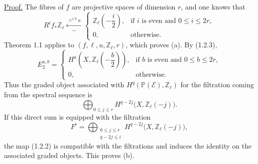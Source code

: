 \noindent\underline{Proof.}
The fibres of $f$ are projective spaces of dimension $r$, and one knows that
\begin{equation}\tag{1.2.3}
R^if_*\mathbb Z_\ell
\xleftarrow[\ \sim\ ]{\ \wedge^{i/2}u\ }
\begin{cases}
\mathbb Z_\ell\left(-\dfrac{i}{2}\right),
  & \text{if $i$ is even and $0\leq i\leq2r$},\\[2ex]
0, & \text{otherwise}.
\end{cases}
\end{equation}
Theorem 1.1 applies to $(f,\ell,u,\mathbb Z_\ell,r)$, which proves (a).
By (1.2.3),
\begin{equation}\tag{1.2.4}
E_2^{a,b}=
\begin{cases}
H^a\left(X,\mathbb Z_\ell\left(-\dfrac b2\right)\right),
  & \text{if $b$ is even and $0\leq b\leq2r$},\\[2ex]
0, & \text{otherwise}.
\end{cases}
\end{equation}
Thus the graded object associated with
$H^q(\mathbb P(\mathcal E),\mathbb Z_\ell)$ for the filtration coming
from the spectral sequence is
\[
\bigoplus_{0\leq j\leq r}
H^{q-2j}\bigl(X,\mathbb Z_\ell(-j)\bigr).
\]
If this direct sum is equipped with the filtration
\[
F^i=
\bigoplus_{\substack{0\leq j\leq r\\q-2j\leq i}}
H^{q-2j}\bigl(X,\mathbb Z_\ell(-j)\bigr),
\]
the map (1.2.2) is compatible with the filtrations and induces the identity on
the associated graded objects. This proves (b).

